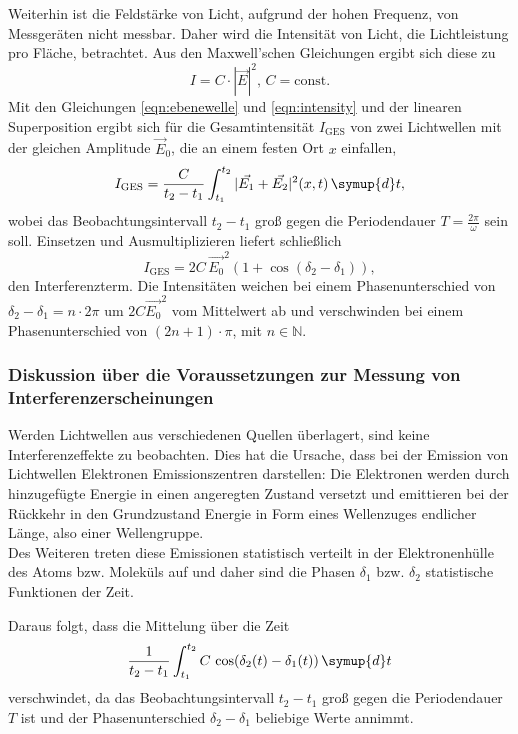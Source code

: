 Weiterhin ist die Feldstärke von Licht, aufgrund der hohen Frequenz, von
Messgeräten nicht messbar. Daher wird die Intensität von Licht, die Lichtleistung pro
Fläche, betrachtet.
Aus den Maxwell'schen Gleichungen ergibt sich diese zu
\begin{equation}
	\label{eqn:intensity}
	I = C \cdot |\vec{E}|^2 \mathrm{, } \, C = \mathrm{const.}
\end{equation}
Mit den Gleichungen \eqref{eqn:ebenewelle} und \eqref{eqn:intensity} und der linearen
Superposition ergibt sich für die Gesamtintensität $I_{\mathrm{GES}}$ von zwei Lichtwellen mit
der gleichen Amplitude $\vec{E}_0$, die an einem festen Ort $x$ einfallen,
\begin{equation}
	I_{\mathrm{GES}} = \frac{C}{t_2 - t_1} \int_{t_1}^{t_2} |\vec{E_1} + \vec{E_2}|^2(x,t) \,  \symup{d}t \mathrm{,}
\end{equation}
wobei das Beobachtungsintervall $t_2 - t_1$ groß gegen die Periodendauer $T=\frac{2\pi}{\omega}$
sein soll.
Einsetzen und Ausmultiplizieren liefert schließlich
\begin{equation}
	\label{eqn:4}
	I_{\mathrm{GES}} = 2C \, \vec{E_0}^2 (1+\cos(\delta_2 - \delta_1)) \mathrm{,}
\end{equation}
den Interferenzterm. Die Intensitäten weichen bei einem Phasenunterschied von
$\delta_2 - \delta_1 = n \cdot 2\pi$ um $2C \vec{E_0}^2$ vom Mittelwert ab und verschwinden
bei einem Phasenunterschied von $(2n+1) \cdot \pi$, mit $n \in \mathbb{N}$.


\subsubsection{Diskussion über die Voraussetzungen zur Messung von Interferenzerscheinungen}
\label{sec:messunginterferenz}

Werden Lichtwellen aus verschiedenen Quellen überlagert, sind keine Interferenzeffekte zu
beobachten. Dies hat die Ursache, dass bei der Emission von Lichtwellen Elektronen
Emissionszentren darstellen: Die Elektronen werden durch hinzugefügte Energie in einen
angeregten Zustand versetzt und emittieren bei der Rückkehr in den Grundzustand Energie in Form
eines Wellenzuges endlicher Länge, also einer Wellengruppe. \\Des Weiteren treten diese Emissionen
statistisch verteilt in der Elektronenhülle des Atoms bzw. Moleküls auf und daher sind die Phasen
$\delta_1$ bzw. $\delta_2$ statistische Funktionen der Zeit.

Daraus folgt, dass die Mittelung über die Zeit
\begin{equation}
	\frac{1}{t_2-t_1} \int_{t_1}^{t_2} C \, \cos(\delta_2(t)-\delta_1(t)) \, \symup{d}t
\end{equation}
verschwindet, da das Beobachtungsintervall $t_2-t_1$ groß gegen die Periodendauer $T$ ist und
der Phasenunterschied $\delta_2-\delta_1$ beliebige Werte annimmt.

